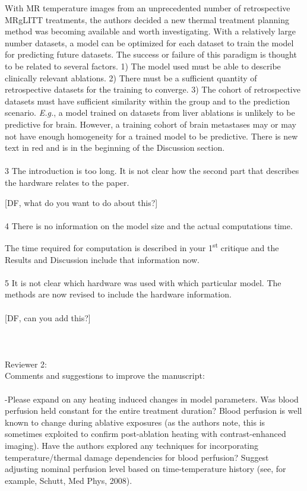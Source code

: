\documentclass[letterpaper,12pt]{report}
\begin{document}
{\color{red}
With MR temperature images from an unprecedented number of retrospective MRgLITT treatments, the authors
decided a new thermal treatment planning method was becoming available and worth investigating. With a relatively large number datasets, a model can be
optimized for each dataset to train the model for predicting future datasets. The success or failure of this paradigm is thought to be related to several
factors. 1) The model used must be able to describe clinically relevant ablations. 2) There must be a sufficient quantity of retrospective datasets for the
training to converge. 3) The cohort of retrospective datasets must have sufficient similarity within the
group and to the prediction scenario. \textit{E.g.}, a model trained on datasets from liver ablations is unlikely to
be predictive for brain. However, a training cohort of brain metastases may or may not have enough homogeneity
for a trained model to be predictive. There is new text in red and is in the beginning of the Discussion
section.
}\\
\\
3	The introduction is too long. It is not clear how the second part that describes the hardware relates to the paper. 

{\color{red}
{\color{green}[DF, what do you want to do about this?]}
}\\
\\
4	There is no information on the model size and the actual computations time.

{\color{red}
The time required for computation is described in your
1\textsuperscript{st} critique and the Results and Discussion include that information now.
}\\
\\
5	It is not clear which hardware was used with which particular model. 
{\color{red}
The methods are now revised to include the hardware information.\\
\\
{\color{green}[DF, can you add this?]}
}\\
\\
\\
\\
Reviewer 2:\\
Comments and suggestions to improve the manuscript:\\
\\
-Please expand on any heating induced changes in model parameters. Was blood perfusion held constant for the
entire treatment duration? Blood perfusion is well
known to change during ablative exposures (as the
authors note, this is sometimes exploited to confirm post-ablation heating with contrast-enhanced imaging).  Have the authors explored any techniques for
incorporating temperature/thermal damage dependencies for blood perfusion? Suggest adjusting nominal
perfusion level based on time-temperature history (see, for example, Schutt, Med Phys, 2008).
\end{document}
